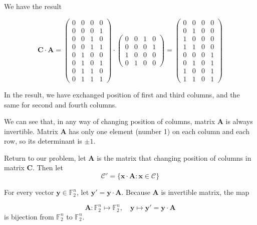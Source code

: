 \documentclass{article}
\newcommand{\FF}{\mathbb{F}}
\begin{document}
We have the result

\[ \bm{C} \cdot \bm{A} = \begin{pmatrix}
    0 & 0 & 0 & 0 \\
    0 & 0 & 0 & 1 \\
    0 & 0 & 1 & 0 \\
    0 & 0 & 1 & 1 \\
    0 & 1 & 0 & 0 \\
    0 & 1 & 0 & 1 \\
    0 & 1 & 1 & 0 \\
    0 & 1 & 1 & 1    
\end{pmatrix} \cdot \begin{pmatrix}
    0 & 0 & 1 & 0 \\
    0 & 0 & 0 & 1 \\
    1 & 0 & 0 & 0 \\
    0 & 1 & 0 & 0 
\end{pmatrix} = \begin{pmatrix}
    0 & 0 & 0 & 0 \\
    0 & 1 & 0 & 0 \\
    1 & 0 & 0 & 0 \\
    1 & 1 & 0 & 0 \\
    0 & 0 & 0 & 1 \\
    0 & 1 & 0 & 1 \\
    1 & 0 & 0 & 1 \\
    1 & 1 & 0 & 1
\end{pmatrix} \]

In the result, we have exchanged position of first and third columns, and the same for second and fourth columns.

We can see that, in any way of changing position of columns, matrix $\bm{A}$ is always invertible. Matrix $\bm{A}$ has only one element (number 1) on each column and each row, so its determinant is $\pm 1$.

Return to our problem, let $\bm{A}$ is the matrix that changing position of columns in matrix $\bm{C}$. Then let \[ \mathcal{C}' = \{ \bm{x} \cdot \bm{A} : \bm{x} \in \mathcal{C} \} \]

For every vector $\bm{y} \in \FF_2^n$, let $\bm{y}' = \bm{y} \cdot \bm{A}$. Because $\bm{A}$ is invertible matrix, the map

\begin{equation}
    \bm{A}: \FF_2^n \mapsto \FF_2^n, \quad \bm{y} \mapsto \bm{y}' = \bm{y} \cdot \bm{A}
\end{equation}
is bijection from $\FF_2^n$ to $\FF_2^n$.
\end{document}
